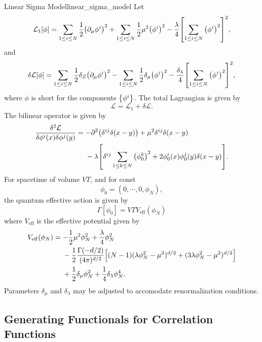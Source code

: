 \documentclass{article}
\begin{document}
\begin{example}{Linear Sigma Model}{linear_sigma_model}
    Let
    \[ \mathcal{L}_1[\phi] = \sum_{1\le i \le N} \frac{1}{2}\qty(\partial_\mu \phi^i)^2 + \sum_{1\le i \le N} \frac{1}{2} \mu^2 \qty(\phi^i)^2 - \frac{\lambda}{4}\qty[\sum_{1\le i \le N} \qty(\phi^i)^2]^2, \]
    and
    \[ \delta\mathcal{L}[\phi] = \sum_{1\le i \le N} \frac{1}{2}\delta_Z \qty(\partial_\mu \phi^i)^2 - \sum_{1\le i \le N} \frac{1}{2}\delta_\mu\qty(\phi^i)^2 - \frac{\delta_\lambda}{4}\qty[\sum_{1\le i \le N} \qty(\phi^i)^2]^2, \]
    where $\phi$ is short for the components $\qty{\phi^i}$. The total Lagrangian is given by
    \[ \mathcal{L} = \mathcal{L}_1 + \delta \mathcal{L}. \]
    The bilinear operator is given by
    \begin{align*}
        \frac{\delta^2 \mathcal{L}}{\delta \phi^i(x) \delta \phi^j (y)} &= -\partial^2 \qty(\delta^{ij}\delta(x-y)) + \mu^2 \delta^{ij} \delta(x-y) \\
        &{\phantom{{}={}}} - \lambda\qty[\delta^{ij} \sum_{1\le k \le N} \qty(\phi^k_0)^2 + 2\phi_0^i(x)\phi_0^j(y)\delta(x-y)].
    \end{align*}
    For spacetime of volume $VT$, and for const
    \[ \phi_0 = (0,\cdots,0,\phi_N), \]
    the quantum effective action is given by
    \[ \Gamma[\phi_0] = VT V_{\mathrm{eff}}(\phi_N) \]
    where $V_{\mathrm{eff}}$ is the effective potential given by
    \begin{align*}
        V_{\mathrm{eff}}(\phi_N) &= -\frac{1}{2} \mu^2 \phi^2_N + \frac{\lambda}{4} \phi^2_N \\
        &{\phantom{{}={}}} -\frac{1}{2} \frac{\Gamma(-d/2)}{(4\pi)^{d/2}}\qty[(N-1)(\lambda \phi^2_N - \mu^2)^{d/2} + (3\lambda \phi^2_N - \mu^2)^{d/2}] \\
        &{\phantom{{}={}}} + \frac{1}{2}\delta_\mu \phi^2_N + \frac{1}{4} \delta_\lambda \phi^4_N.
    \end{align*}
    Parameters $\delta_\mu$ and $\delta_\lambda$ may be adjusted to accomodate renormalization conditions.
\end{example}

\subsection{Generating Functionals for Correlation Functions}
\end{document}
